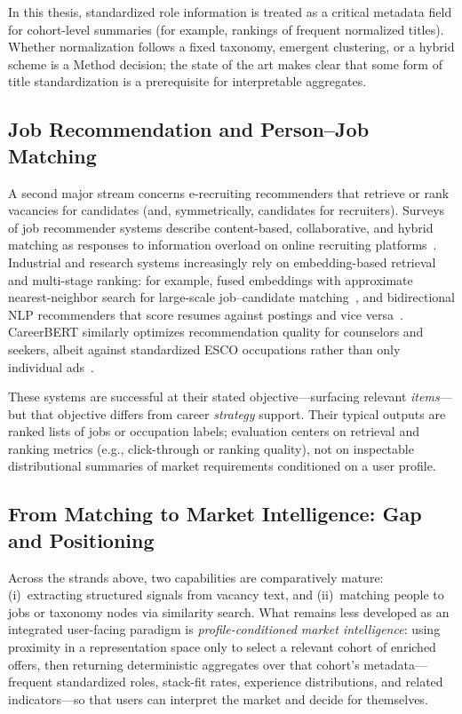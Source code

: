 In this thesis, standardized role information is treated as a critical metadata field for cohort-level summaries (for example, rankings of frequent normalized titles).
Whether normalization follows a fixed taxonomy, emergent clustering, or a hybrid scheme is a Method decision; the state of the art makes clear that some form of title standardization is a prerequisite for interpretable aggregates.

\subsection{Job Recommendation and Person--Job Matching}
\label{sec:sota-recommenders}

A second major stream concerns e-recruiting recommenders that retrieve or rank vacancies for candidates (and, symmetrically, candidates for recruiters).
Surveys of job recommender systems describe content-based, collaborative, and hybrid matching as responses to information overload on online recruiting platforms~\cite{AlOtaibi2012}.
Industrial and research systems increasingly rely on embedding-based retrieval and multi-stage ranking: for example, fused embeddings with approximate nearest-neighbor search for large-scale job--candidate matching~\cite{Zhao2021}, and bidirectional NLP recommenders that score resumes against postings and vice versa~\cite{Alsaif2022}.
CareerBERT similarly optimizes recommendation quality for counselors and seekers, albeit against standardized ESCO occupations rather than only individual ads~\cite{Rosenberger2025}.

These systems are successful at their stated objective---surfacing relevant \emph{items}---but that objective differs from career \emph{strategy} support.
Their typical outputs are ranked lists of jobs or occupation labels; evaluation centers on retrieval and ranking metrics (e.g., click-through or ranking quality), not on inspectable distributional summaries of market requirements conditioned on a user profile.

\subsection{From Matching to Market Intelligence: Gap and Positioning}
\label{sec:sota-gap}

Across the strands above, two capabilities are comparatively mature: (i)~extracting structured signals from vacancy text, and (ii)~matching people to jobs or taxonomy nodes via similarity search.
What remains less developed as an integrated user-facing paradigm is \emph{profile-conditioned market intelligence}: using proximity in a representation space only to select a relevant cohort of enriched offers, then returning deterministic aggregates over that cohort's metadata---frequent standardized roles, stack-fit rates, experience distributions, and related indicators---so that users can interpret the market and decide for themselves.

